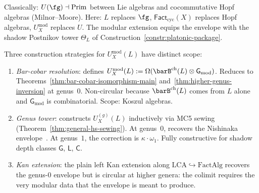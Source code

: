 \begin{remark}
\label{rem:platonic-adjunction-classical}
Classically: $U(\fg) \dashv \mathrm{Prim}$ between Lie algebras
and cocommutative Hopf algebras (Milnor--Moore).  Here: $L$ replaces
$\fg$, $\mathsf{Fact}_{\mathrm{cyc}}(X)$ replaces Hopf algebras,
$U_X^{\mathrm{mod}}$ replaces $U$.  The modular
extension equips the envelope with the shadow Postnikov tower
$\Theta_L$ of
Construction~\textup{\ref{constr:platonic-package}}.
\end{remark}

\begin{proposition}
\label{prop:envelope-construction-strategies}
\ClaimStatusProvedHere
{}
Three construction strategies for $U^{\mathrm{mod}}_X(L)$ have
distinct scope:
\begin{enumerate}[label=\textup{(\roman*)}]
\item \emph{Bar-cobar resolution}: defines
  $U^{\mathrm{mod}}_X(L) := \Omega(\barB^{\mathrm{ch}}(L) \otimes
  \mathsf{G}_{\mathrm{mod}})$.  Reduces to
  Theorems~\textup{\ref{thm:bar-cobar-isomorphism-main}}
  and~\textup{\ref{thm:higher-genus-inversion}} at genus~$0$.
  Non-circular because $\barB^{\mathrm{ch}}(L)$ comes from $L$
  alone and $\mathsf{G}_{\mathrm{mod}}$ is combinatorial.
  Scope: Koszul algebras.
\item \emph{Genus tower}: constructs $U^{(g)}_X(L)$ inductively via
  MC5 sewing
  \textup{(}Theorem~\textup{\ref{thm:general-hs-sewing}}\textup{)}.
  At genus~$0$, recovers the Nishinaka envelope~\cite{Nish26}.
  At genus~$1$, the correction is
  $\kappa \cdot \omega_1$.  Fully constructive for shadow depth
  classes $\mathsf{G}$, $\mathsf{L}$, $\mathsf{C}$.
\item \emph{Kan extension}: the plain left Kan extension along
  $\mathrm{LCA} \hookrightarrow \mathrm{FactAlg}$ recovers the
  genus-$0$ envelope but is circular at higher genera: the
  colimit requires the very modular data that the envelope is
  meant to produce.
\end{enumerate}
\end{proposition}

